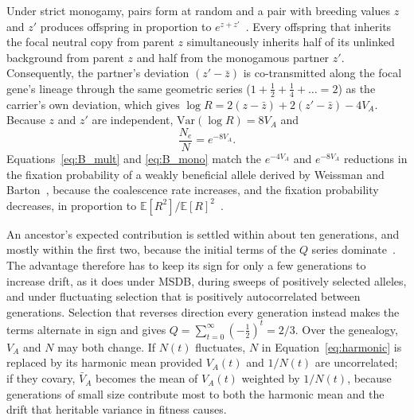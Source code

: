 \documentclass{article}
\begin{document}
Under strict monogamy, pairs form at random and a pair with breeding values $z$ and $z'$ produces offspring in proportion to $e^{z + z'}$~\cite{weissman2012}. Every offspring that inherits the focal neutral copy from parent $z$ simultaneously inherits half of its unlinked background from parent $z$ and half from the monogamous partner $z'$. Consequently, the partner's deviation $(z' - \bar{z})$ is co-transmitted along the focal gene's lineage through the same geometric series ($1 + \tfrac12 + \tfrac14 + \dots = 2$) as the carrier's own deviation, which gives $\log R = 2(z - \bar{z}) + 2(z' - \bar{z}) - 4V_A$. Because $z$ and $z'$ are independent, $\mathrm{Var}(\log R) = 8V_A$ and
\begin{equation}
    \frac{N_e}{N} = e^{-8V_A}. \label{eq:B_mono}
\end{equation}
Equations~\eqref{eq:B_mult} and \eqref{eq:B_mono} match the $e^{-4V_A}$ and $e^{-8V_A}$ reductions in the fixation probability of a weakly beneficial allele derived by Weissman and Barton~\cite{weissman2012}, because the coalescence rate increases, and the fixation probability decreases, in proportion to $\mathbb{E}[R^2]/\mathbb{E}[R]^2$~\cite{kimura1962}.

An ancestor's expected contribution is settled within about ten generations, and mostly within the first two, because the initial terms of the $Q$ series dominate~\cite{barton2011}. The advantage therefore has to keep its sign for only a few generations to increase drift, as it does under MSDB, during sweeps of positively selected alleles, and under fluctuating selection that is positively autocorrelated between generations. Selection that reverses direction every generation instead makes the terms alternate in sign and gives $Q = \sum_{t=0}^{\infty}(-\tfrac{1}{2})^t = 2/3$. Over the genealogy, $V_A$ and $N$ may both change. If $N(t)$ fluctuates, $N$ in Equation~\eqref{eq:harmonic} is replaced by its harmonic mean provided $V_A(t)$ and $1/N(t)$ are uncorrelated; if they covary, $\bar{V}_A$ becomes the mean of $V_A(t)$ weighted by $1/N(t)$, because generations of small size contribute most to both the harmonic mean and the drift that heritable variance in fitness causes.
\end{document}
